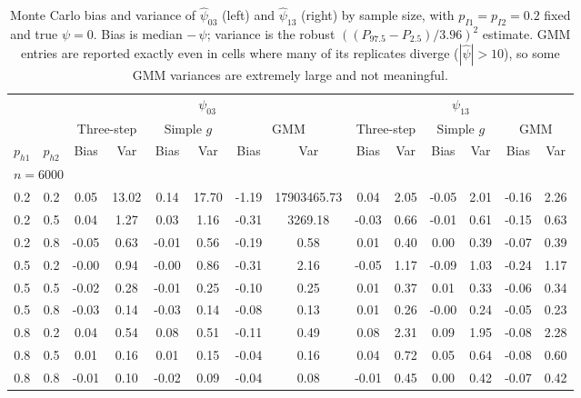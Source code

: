 \begin{table}[t]
\centering
\setlength{\tabcolsep}{4pt}\small
\caption{Monte Carlo bias and variance of $\widehat\psi_{03}$ (left) and $\widehat\psi_{13}$ (right) by sample size, with $p_{I1}=p_{I2}=0.2$ fixed and true $\psi=0$. Bias is median $-\,\psi$; variance is the robust $((P_{97.5}-P_{2.5})/3.96)^2$ estimate. GMM entries are reported exactly even in cells where many of its replicates diverge ($|\hat\psi|>10$), so some GMM variances are extremely large and not meaningful.}
\label{tab:mc-bias-var-psi03}
\begin{tabular}{cc cc cc cc cc cc cc }
\toprule
& & \multicolumn{6}{c}{$\psi_{03}$} & \multicolumn{6}{c}{$\psi_{13}$} \\
\cmidrule(lr){3-8} \cmidrule(lr){9-14}
& & \multicolumn{2}{c}{Three-step} & \multicolumn{2}{c}{Simple $g$} & \multicolumn{2}{c}{GMM} & \multicolumn{2}{c}{Three-step} & \multicolumn{2}{c}{Simple $g$} & \multicolumn{2}{c}{GMM} \\
\cmidrule(lr){3-4} \cmidrule(lr){5-6} \cmidrule(lr){7-8} \cmidrule(lr){9-10} \cmidrule(lr){11-12} \cmidrule(lr){13-14}
$p_{h1}$ & $p_{h2}$ & Bias & Var & Bias & Var & Bias & Var & Bias & Var & Bias & Var & Bias & Var \\
\midrule
\multicolumn{14}{l}{\textit{$n = 6000$}} \\
0.2 & 0.2 & 0.05 & 13.02 & 0.14 & 17.70 & -1.19 & 17903465.73 & 0.04 & 2.05 & -0.05 & 2.01 & -0.16 & 2.26 \\
0.2 & 0.5 & 0.04 & 1.27 & 0.03 & 1.16 & -0.31 & 3269.18 & -0.03 & 0.66 & -0.01 & 0.61 & -0.15 & 0.63 \\
0.2 & 0.8 & -0.05 & 0.63 & -0.01 & 0.56 & -0.19 & 0.58 & 0.01 & 0.40 & 0.00 & 0.39 & -0.07 & 0.39 \\
0.5 & 0.2 & -0.00 & 0.94 & -0.00 & 0.86 & -0.31 & 2.16 & -0.05 & 1.17 & -0.09 & 1.03 & -0.24 & 1.17 \\
0.5 & 0.5 & -0.02 & 0.28 & -0.01 & 0.25 & -0.10 & 0.25 & 0.01 & 0.37 & 0.01 & 0.33 & -0.06 & 0.34 \\
0.5 & 0.8 & -0.03 & 0.14 & -0.03 & 0.14 & -0.08 & 0.13 & 0.01 & 0.26 & -0.00 & 0.24 & -0.05 & 0.23 \\
0.8 & 0.2 & 0.04 & 0.54 & 0.08 & 0.51 & -0.11 & 0.49 & 0.08 & 2.31 & 0.09 & 1.95 & -0.08 & 2.28 \\
0.8 & 0.5 & 0.01 & 0.16 & 0.01 & 0.15 & -0.04 & 0.16 & 0.04 & 0.72 & 0.05 & 0.64 & -0.08 & 0.60 \\
0.8 & 0.8 & -0.01 & 0.10 & -0.02 & 0.09 & -0.04 & 0.08 & -0.01 & 0.45 & 0.00 & 0.42 & -0.07 & 0.42 \\

\end{tabular}
\end{table}
